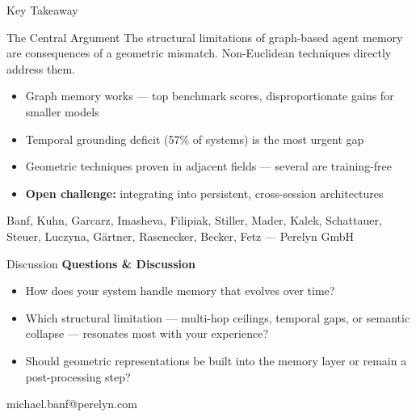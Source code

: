 \documentclass[aspectratio=169]{beamer}
\begin{document}
\begin{frame}{Key Takeaway}
  \begin{block}{The Central Argument}
    The structural limitations of graph-based agent memory are consequences of a
    \alert{geometric mismatch}. Non-Euclidean techniques directly address them.
  \end{block}

  \vspace{0.2cm}

  \begin{itemize}
    \item Graph memory \alert{works} --- top benchmark scores,
      disproportionate gains for smaller models
    \item \alert{Temporal grounding deficit} (57\% of systems) is the most urgent gap
    \item Geometric techniques \alert{proven in adjacent fields} ---
      several are training-free
    \item \textbf{Open challenge:} integrating into persistent,
      cross-session architectures
  \end{itemize}

  \vspace{0.2cm}

  {\footnotesize Banf, Kuhn, Garcarz, Imasheva, Filipiak, Stiller, Mader, Kalek,
  Schattauer, Steuer, Luczyna, G\"artner, Rasenecker, Becker, Fetz --- Perelyn GmbH}
\end{frame}


\begin{frame}{Discussion}
  \centering
  \vfill
  {\Large\bfseries Questions \& Discussion}
  \vfill

  \begin{itemize}
    \item How does your system handle memory that evolves over time?
    \item Which structural limitation --- multi-hop ceilings, temporal gaps,
      or semantic collapse --- resonates most with your experience?
    \item Should geometric representations be built into the memory layer
      or remain a post-processing step?
  \end{itemize}
  \vfill

  {\small michael.banf@perelyn.com}
\end{frame}

\begin{frame}[plain]
  \titlepage
\end{frame}
\end{document}
